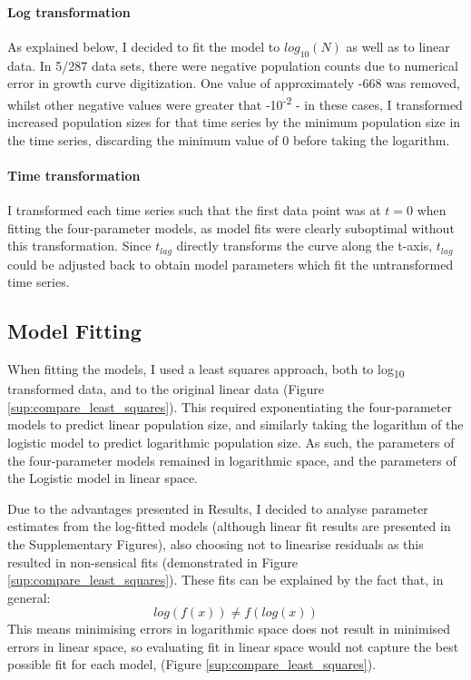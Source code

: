 \documentclass[11pt, a4paper]{article}
\begin{document}
\begin{linenumbers}
\paragraph{Log transformation}
As explained below, I decided to fit the model to $log_{10}(N)$ as well as to linear data. In 5/287 data sets, there were negative population counts due to numerical error in growth curve digitization. One value of approximately -668 was removed, whilst other negative values were greater that -10\textsuperscript{-2} - in these cases, I transformed increased population sizes for that time series by the minimum population size in the time series, discarding the minimum value of 0 before taking the logarithm.  

\paragraph{Time transformation}
I transformed each time series such that the first data point was at $t = 0$ when fitting the four-parameter models, as model fits were clearly suboptimal without this transformation. Since $t_{lag}$ directly transforms the curve along the t-axis, $t_{lag}$ could be adjusted back to obtain model parameters which fit the untransformed time series. 

\subsection{Model Fitting}
When fitting the models, I used a least squares approach, both to log\textsubscript{10} transformed data, and to the original linear data (Figure \ref{sup:compare_least_squares}). This required exponentiating the four-parameter models to predict linear population size, and similarly taking the logarithm of the logistic model to predict logarithmic population size. As such, the parameters of the four-parameter models remained in logarithmic space, and the parameters of the Logistic model in linear space. 

Due to the advantages presented in Results, I decided to analyse parameter estimates from the log-fitted models (although linear fit results are presented in the Supplementary Figures), also choosing not to linearise residuals as this resulted in non-sensical fits (demonstrated in Figure \ref{sup:compare_least_squares}). These fits can be explained by the fact that, in general:
\[log(f(x) ) \neq f(log(x))\]
This means minimising errors in logarithmic space does not result in minimised errors in linear space, so evaluating fit in linear space would not capture the best possible fit for each model, (Figure \ref{sup:compare_least_squares}).


\end{linenumbers}
\end{document}
